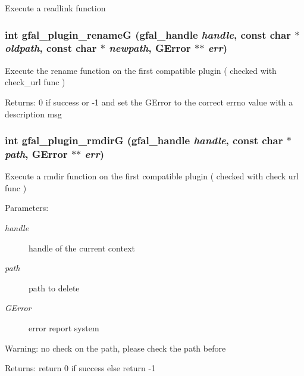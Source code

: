 Execute a readlink function 
\subsubsection{\setlength{\rightskip}{0pt plus 5cm}int gfal\_\-plugin\_\-rename\-G (gfal\_\-handle {\em handle}, const char $\ast$ {\em oldpath}, const char $\ast$ {\em newpath}, GError $\ast$$\ast$ {\em err})}\label{gfal__common__plugin_8c_ee26850796f50439ded98dafc7cd064b}


Execute the rename function on the first compatible plugin ( checked with check\_\-url func ) \begin{Desc}
\item[Returns:]0 if success or -1 and set the GError to the correct errno value with a description msg \end{Desc}
\subsubsection{\setlength{\rightskip}{0pt plus 5cm}int gfal\_\-plugin\_\-rmdir\-G (gfal\_\-handle {\em handle}, const char $\ast$ {\em path}, GError $\ast$$\ast$ {\em err})}\label{gfal__common__plugin_8c_d3bcfafdf8d90935cb312388cdd6bb92}


Execute a rmdir function on the first compatible plugin ( checked with check url func ) \begin{Desc}
\item[Parameters:]
\begin{description}
\item[{\em handle}]handle of the current context \item[{\em path}]path to delete \item[{\em GError}]error report system \end{description}
\end{Desc}
\begin{Desc}
\item[Warning:]no check on the path, please check the path before \end{Desc}
\begin{Desc}
\item[Returns:]return 0 if success else return -1 \end{Desc}
